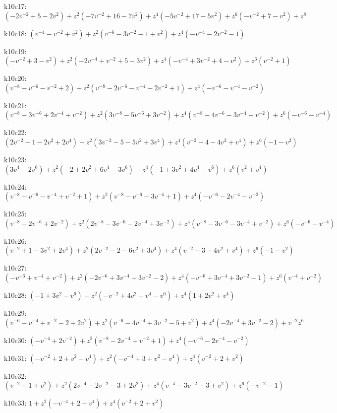 k10c17: $ (-2v^{-2}+5-2v^{2})  +z^{2}(-7v^{-2}+16-7v^{2})  +z^{4}(-5v^{-2}+17-5v^{2})  +z^{6}(-v^{-2}+7-v^{2})  +z^{8} $ 

k10c18: $ (v^{-4}-v^{-2}+v^{2})  +z^{2}(v^{-6}-3v^{-2}-1+v^{2})  +z^{4}(-v^{-4}-2v^{-2}-1) $ 

k10c19: $ (-v^{-2}+3-v^{2})  +z^{2}(-2v^{-4}+v^{-2}+5-3v^{2})  +z^{4}(-v^{-4}+3v^{-2}+4-v^{2})  +z^{6}(v^{-2}+1) $ 

k10c20: $ (v^{-8}-v^{-6}-v^{-2}+2)  +z^{2}(v^{-8}-2v^{-6}-v^{-4}-2v^{-2}+1)  +z^{4}(-v^{-6}-v^{-4}-v^{-2}) $ 

k10c21: $ (v^{-8}-3v^{-6}+2v^{-4}+v^{-2})  +z^{2}(3v^{-8}-5v^{-6}+3v^{-2})  +z^{4}(v^{-8}-4v^{-6}-3v^{-4}+v^{-2})  +z^{6}(-v^{-6}-v^{-4}) $ 

k10c22: $ (2v^{-2}-1-2v^{2}+2v^{4})  +z^{2}(3v^{-2}-5-5v^{2}+3v^{4})  +z^{4}(v^{-2}-4-4v^{2}+v^{4})  +z^{6}(-1-v^{2}) $ 

k10c23: $ (3v^{4}-2v^{6})  +z^{2}(-2+2v^{2}+6v^{4}-3v^{6})  +z^{4}(-1+3v^{2}+4v^{4}-v^{6})  +z^{6}(v^{2}+v^{4}) $ 

k10c24: $ (v^{-8}-v^{-6}-v^{-4}+v^{-2}+1)  +z^{2}(v^{-8}-v^{-6}-3v^{-4}+1)  +z^{4}(-v^{-6}-2v^{-4}-v^{-2}) $ 

k10c25: $ (v^{-8}-2v^{-6}+2v^{-2})  +z^{2}(2v^{-8}-3v^{-6}-2v^{-4}+3v^{-2})  +z^{4}(v^{-8}-3v^{-6}-3v^{-4}+v^{-2})  +z^{6}(-v^{-6}-v^{-4}) $ 

k10c26: $ (v^{-2}+1-3v^{2}+2v^{4})  +z^{2}(2v^{-2}-2-6v^{2}+3v^{4})  +z^{4}(v^{-2}-3-4v^{2}+v^{4})  +z^{6}(-1-v^{2}) $ 

k10c27: $ (-v^{-6}+v^{-4}+v^{-2})  +z^{2}(-2v^{-6}+3v^{-4}+3v^{-2}-2)  +z^{4}(-v^{-6}+3v^{-4}+3v^{-2}-1)  +z^{6}(v^{-4}+v^{-2}) $ 

k10c28: $ (-1+3v^{2}-v^{6})  +z^{2}(-v^{-2}+4v^{2}+v^{4}-v^{6})  +z^{4}(1+2v^{2}+v^{4}) $ 

k10c29: $ (v^{-6}-v^{-4}+v^{-2}-2+2v^{2})  +z^{2}(v^{-6}-4v^{-4}+3v^{-2}-5+v^{2})  +z^{4}(-2v^{-4}+3v^{-2}-2)  +v^{-2}z^{6} $ 

k10c30: $ (-v^{-4}+2v^{-2})  +z^{2}(v^{-8}-2v^{-4}+v^{-2}+1)  +z^{4}(-v^{-6}-2v^{-4}-v^{-2}) $ 

k10c31: $ (-v^{-2}+2+v^{2}-v^{4})  +z^{2}(-v^{-4}+3+v^{2}-v^{4})  +z^{4}(v^{-2}+2+v^{2}) $ 

k10c32: $ (v^{-2}-1+v^{2})  +z^{2}(2v^{-4}-2v^{-2}-3+2v^{2})  +z^{4}(v^{-4}-3v^{-2}-3+v^{2})  +z^{6}(-v^{-2}-1) $ 

k10c33: $ 1  +z^{2}(-v^{-4}+2-v^{4})  +z^{4}(v^{-2}+2+v^{2}) $ 

